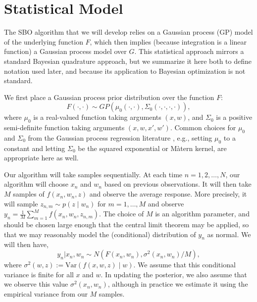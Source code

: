 \documentclass{article} %
\newcommand{\w}{w}
\newcommand{\z}{z}
\begin{document}
\section{Statistical Model}
\label{model}

The SBO algorithm that we will develop relies on a Gaussian process (GP) model of the underlying function $F$, which then implies (because integration is a linear function) a Gaussian process model over $G$.
This statistical approach mirrors a standard Bayesian quadrature approach, but we summarize it here both to define notation used later, and because its application to Bayesian optimization is not standard.

We first place a Gaussian process prior distribution over the function
$F$:
\[
F\left(\cdot,\cdot\right)\sim GP\left(\mu_{0}\left(\cdot,\cdot\right),\Sigma_{0}\left(\cdot,\cdot,\cdot,\cdot\right)\right),
\]
where $\mu_{0}$ is a real-valued function taking arguments $\left(x,\w\right)$, and $\Sigma_{0}$ is a positive semi-definite function taking arguments $\left(x,\w,x',\w'\right)$.
Common choices for $\mu_0$ and $\Sigma_0$ from the Gaussian process regression literature \cite{RaWi06,murphy2012machine},
e.g., setting $\mu_0$ to a constant and letting $\Sigma_0$ be the squared exponential or M\`{a}tern kernel, are appropriate here as well.

Our algorithm will take samples sequentially. 
At each time $n=1,2,\ldots,N$, our algorithm will choose 
$x_{n}$ and $\w_{n}$ based on previous observations.
It will then take $M$ samples of $f\left(x_n,\w_n,\z\right)$ and observe the average response.
More precisely, it will sample $\z_{n,m}\sim p\left(\z\mid \w_{n}\right)$
for $m=1,\ldots,M$ and observe $y_{n}=\frac{1}{M}\sum_{m=1}^{M}f\left(x_{n},\w_{n},\z_{n,m}\right)$. 
The choice of $M$ is an algorithm parameter, and should be chosen large enough
that the central limit theorem may be applied, so that we may
reasonably model the (conditional) distribution of $y_n$ as normal.  We will then have,
\begin{equation*}
y_{n} | x_n, \w_n  \sim N\left( F\left(x_{n},\w_{n}\right), \sigma^{2}\left(x_{n},\w_{n}\right)/M \right),
\end{equation*}
where $\sigma^{2}\left(\w,\z\right):=\mbox{Var}\left(f\left(x,\w,\z\right)\mid \w\right)$.
We assume that this conditional variance is finite for all $x$ and $\w$.
In updating the posterior, we also assume that we observe this value $\sigma^{2}\left(x_{n},\w_{n}\right)$, although in practice we estimate it using the empirical variance from our $M$ samples.
\end{document}
